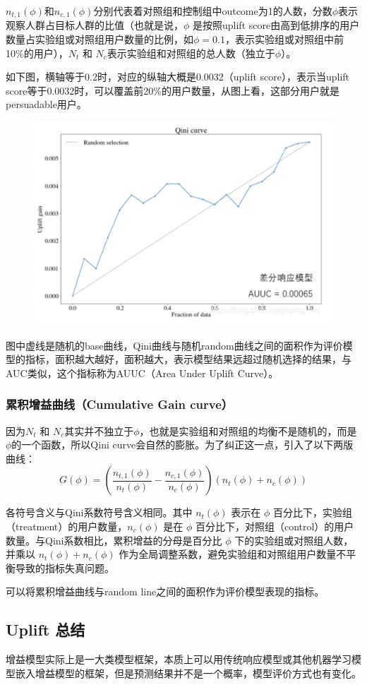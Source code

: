 \documentclass[12pt]{article}
\begin{document}
$n_{t,1}(\phi)$和$n_{c,1}(\phi)$分别代表着对照组和控制组中outcome为1的人数，分数$\phi$表示观察人群占目标人群的比值（也就是说，$\phi$ 是按照uplift score由高到低排序的用户数量占实验组或对照组用户数量的比例，如$ \phi = 0.1$，表示实验组或对照组中前10\%的用户），$N_t$ 和 $N_c$表示实验组和对照组的总人数（独立于$\phi$）。

如下图，横轴等于0.2时，对应的纵轴大概是0.0032（uplift score），表示当uplift score等于0.0032时，可以覆盖前20\%的用户数量，从图上看，这部分用户就是persuadable用户。
\begin{figure}[H]
    \centering
    \includegraphics[width=.6\textwidth]{fig/CasualInference-Uplift_Evaluate_Qini_Curve.png}
\end{figure}

图中虚线是随机的base曲线，Qini曲线与随机random曲线之间的面积作为评价模型的指标，面积越大越好，面积越大，表示模型结果远超过随机选择的结果，与AUC类似，这个指标称为AUUC（Area Under Uplift Curve）。

\subsubsection{累积增益曲线（Cumulative Gain curve）}
因为$N_t$ 和 $N_c$其实并不独立于$\phi$，也就是实验组和对照组的均衡不是随机的，而是$\phi$的一个函数，所以Qini curve会自然的膨胀。为了纠正这一点，引入了以下两版曲线：
$$
G(\phi) =  (\frac{n_{t,1}(\phi)}{n_t(\phi)} - \frac{n_{c,1}(\phi)}{n_c(\phi)})(n_t(\phi) + n_c(\phi))
$$

各符号含义与Qini系数符号含义相同。其中 $n_t(\phi)$ 表示在 $\phi$ 百分比下，实验组（treatment）的用户数量，$n_c(\phi)$ 是在 $\phi$ 百分比下，对照组（control）的用户数量。与Qini系数相比，累积增益的分母是百分比 $\phi$ 下的实验组或对照组人数，并乘以 $n_t(\phi) + n_c(\phi)$ 作为全局调整系数，避免实验组和对照组用户数量不平衡导致的指标失真问题。

可以将累积增益曲线与random line之间的面积作为评价模型表现的指标。

\subsection{Uplift 总结}
增益模型实际上是一大类模型框架，本质上可以用传统响应模型或其他机器学习模型嵌入增益模型的框架，但是预测结果并不是一个概率，模型评价方式也有变化。
\end{document}

